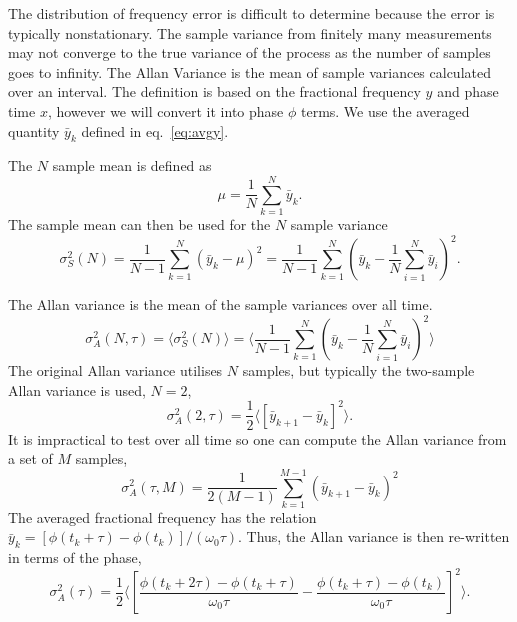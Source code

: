 The distribution of frequency error is difficult to determine because the error is typically nonstationary.  The sample variance from finitely many measurements may not converge to the true variance of the process as the number of samples goes to infinity. The Allan Variance is the mean of sample variances calculated over an interval. The definition is based on the fractional frequency $y$ and phase time $x$, however we will convert it into phase $\phi$ terms. We use the averaged quantity $\bar{y}_k$ defined in eq.~\ref{eq:avgy}.

The $N$ sample mean is defined as
%
\begin{equation}
\mu = \frac{1}{N} \sum_{k=1}^{N} \bar{y}_k.
\end{equation}
%
The sample mean can then be used for the $N$ sample variance
%
\begin{equation}
\sigma_S^2(N) = \frac{1}{N-1} \sum_{k=1}^{N} \left(\bar{y}_k - \mu\right)^2 = \frac{1}{N-1} \sum_{k=1}^{N} \left(\bar{y}_k - \frac{1}{N} \sum_{i=1}^{N} \bar{y}_i\right)^2.
\end{equation}
%

The Allan variance \cite{Allan1974} is the mean of the sample variances over all time.
%
\begin{equation}
\sigma_A^2(N,\tau) = \langle \sigma_S^2(N) \rangle = \bigg\langle \frac{1}{N-1} \sum_{k=1}^{N} \left(\bar{y}_k - \frac{1}{N} \sum_{i=1}^{N} \bar{y}_i\right)^2 \bigg\rangle
\end{equation}
%
The original Allan variance utilises $N$ samples, but typically the two-sample Allan variance is used, $N=2$,
%
\begin{equation} \label{eq:2sallan}
\sigma_A^2(2, \tau) = \frac{1}{2}\langle [\bar{y}_{k+1} - \bar{y}_{k}]^2 \rangle.
\end{equation}
%
It is impractical to test over all time so one can compute the Allan variance from a set of $M$ samples,
%
\begin{equation}
\sigma_A^2(\tau,M) = \frac{1}{2(M-1)}\sum_{k=1}^{M-1} \left(\bar{y}_{k+1} - \bar{y}_{k}\right)^2
\end{equation}
%
The averaged fractional frequency has the relation $\bar{y}_k = [\phi(t_k+\tau) - \phi(t_k)]/(\omega_0\tau)$. Thus, the Allan variance is then re-written in terms of the phase,
% 
\begin{equation} \label{eq:phiallan}
\sigma_A^2(\tau) = \frac{1}{2}\bigg\langle \left[\frac{\phi(t_k+2\tau) - \phi(t_k+\tau)}{\omega_0\tau} - \frac{\phi(t_k+\tau) - \phi(t_k)}{\omega_0\tau}\right]^2 \bigg\rangle.
\end{equation}


